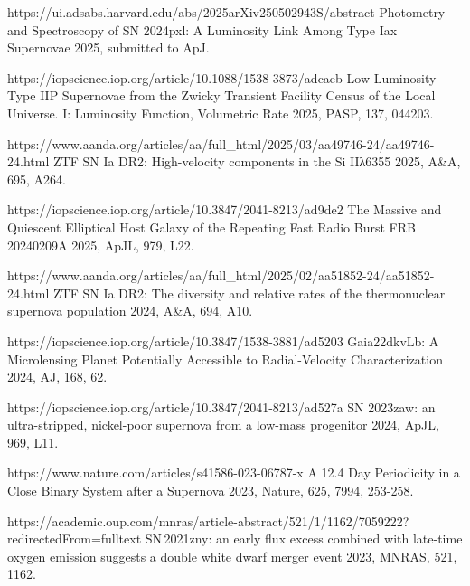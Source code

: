 \begin{cvpubs}
\begin{cvpubitems}
{\Cliu}
{https://ui.adsabs.harvard.edu/abs/2025arXiv250502943S/abstract}
{Photometry and Spectroscopy of SN 2024pxl: A Luminosity Link Among Type Iax Supernovae}
{2025, submitted to ApJ.}

{\Cliu}
{https://iopscience.iop.org/article/10.1088/1538-3873/adcaeb}
{Low-Luminosity Type IIP Supernovae from the Zwicky Transient Facility Census of the Local Universe. I: Luminosity Function, Volumetric Rate}
{2025, PASP, 137, 044203.}

{\Cliu}
{https://www.aanda.org/articles/aa/full_html/2025/03/aa49746-24/aa49746-24.html}
{ZTF SN Ia DR2: High-velocity components in the Si IIλ6355}
{2025, A\&A, 695, A264.}

{\Cliu}
{https://iopscience.iop.org/article/10.3847/2041-8213/ad9de2}
{The Massive and Quiescent Elliptical Host Galaxy of the Repeating Fast Radio Burst FRB 20240209A}
{2025, ApJL, 979, L22.}

{\Cliu}
{https://www.aanda.org/articles/aa/full_html/2025/02/aa51852-24/aa51852-24.html}
{ZTF SN Ia DR2: The diversity and relative rates of the thermonuclear supernova population}
{2024, A\&A, 694, A10.}

{\Cliu}
{https://iopscience.iop.org/article/10.3847/1538-3881/ad5203}
{Gaia22dkvLb: A Microlensing Planet Potentially Accessible to Radial-Velocity Characterization}
{2024, AJ, 168, 62.}

{\Cliu}
{https://iopscience.iop.org/article/10.3847/2041-8213/ad527a}
{SN 2023zaw: an ultra-stripped, nickel-poor supernova from a low-mass progenitor}
{2024, ApJL, 969, L11.}

{\Cliu}
{https://www.nature.com/articles/s41586-023-06787-x}
{A 12.4 Day Periodicity in a Close Binary System after a Supernova}
{2023, Nature, 625, 7994, 253-258.}

{\Cliu}
{https://academic.oup.com/mnras/article-abstract/521/1/1162/7059222?redirectedFrom=fulltext}
{SN\,2021zny: an early flux excess combined with late-time oxygen emission suggests a double white dwarf merger event}
{2023, MNRAS, 521, 1162.}

\end{cvpubitems}


\end{cvpubs}